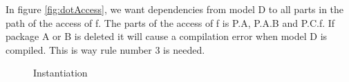 \documentclass{cslthse-msc}
\begin{document}
In figure \ref{fig:dotAccess}, we want dependencies from model D to all parts in the path of the access of f. The parts of the access of f is P.A, P.A.B and P.C.f. If package A or B is deleted it will cause a compilation error when  model D is compiled. This is way rule number 3 is needed.

\begin{figure}[H]
    \centering
    \qquad
    \subfloat{\raisebox{4.7 cm}{}}
    \caption{Instantiation}
    \label{fig:instantiation}
\end{figure}
\end{document}
